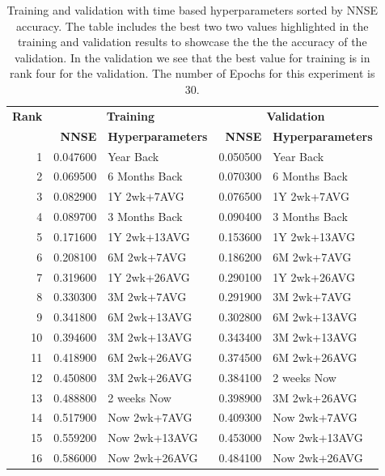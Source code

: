 \documentclass[utf8]{FrontiersinVancouver} %
\begin{document}
\begin{table}[htb]

  \caption{Training and validation with time based hyperparameters
    sorted by NNSE accuracy. The table includes the best two two
    values highlighted in the training and validation results to
    showcase the the the accuracy of the validation. In the validation
    we see that the best value for training is in rank four for the
    validation. The number of Epochs for this experiment is 30.
  }
  \label{tab:training-30}

  \renewcommand{\arraystretch}{1.2}  
\begin{center}  
\begin{tabular}{|r|rl||rl|}
\hline
{\bf Rank} & \multicolumn{2}{c||}{\bfseries Training} & \multicolumn{2}{c|}{\bfseries Validation} \\
     &   {\bf NNSE} & {\bf Hyperparameters} & {\bf NNSE} & {\bf Hyperparameters} \\
              \hline
\hline
 1 & \color{red} 0.047600 & \color{red} Year Back & \color{red} 0.050500 & \color{red} Year Back \\
 2 & \color{blue} 0.069500 & \color{blue} 6 Months Back & \color{blue} 0.070300 & \color{blue} 6 Months Back \\
 3 & 0.082900 & 1Y 2wk+7AVG & 0.076500 & 1Y 2wk+7AVG \\
 4 & 0.089700 & 3 Months Back & 0.090400 & 3 Months Back \\
 5 & 0.171600 & 1Y 2wk+13AVG & 0.153600 & 1Y 2wk+13AVG \\
 6 & 0.208100 & 6M 2wk+7AVG & 0.186200 & 6M 2wk+7AVG \\
 7 & 0.319600 & 1Y 2wk+26AVG & 0.290100 & 1Y 2wk+26AVG \\
 8 & 0.330300 & 3M 2wk+7AVG & 0.291900 & 3M 2wk+7AVG \\
 9 & 0.341800 & 6M 2wk+13AVG & 0.302800 & 6M 2wk+13AVG \\
10 & 0.394600 & 3M 2wk+13AVG & 0.343400 & 3M 2wk+13AVG \\
11 & 0.418900 & 6M 2wk+26AVG & 0.374500 & 6M 2wk+26AVG \\
12 & 0.450800 & 3M 2wk+26AVG & 0.384100 & 2 weeks Now \\
13 & 0.488800 & 2 weeks Now & 0.398900 & 3M 2wk+26AVG \\
14 & 0.517900 & Now 2wk+7AVG & 0.409300 & Now 2wk+7AVG \\
15 & 0.559200 & Now 2wk+13AVG & 0.453000 & Now 2wk+13AVG \\
16 & 0.586000 & Now 2wk+26AVG & 0.484100 & Now 2wk+26AVG \\
\hline
\end{tabular}

\end{center}
\end{table}
\end{document}
